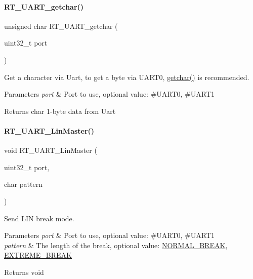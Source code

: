 \paragraph{\texorpdfstring{R\+T\+\_\+\+U\+A\+R\+T\+\_\+getchar()}{RT\_UART\_getchar()}}
{\footnotesize\ttfamily unsigned char R\+T\+\_\+\+U\+A\+R\+T\+\_\+getchar (\begin{DoxyParamCaption}\item[{uint32\+\_\+t}]{port }\end{DoxyParamCaption})}



Get a character via Uart, to get a byte via U\+A\+R\+T0, \mbox{\hyperlink{a00026_a0979671914792955a7a68461634ff82d}{getchar()}} is recommended. 


\begin{DoxyParams}{Parameters}
{\em port} & Port to use, optional value\+: \#\+U\+A\+R\+T0, \#\+U\+A\+R\+T1 \\
\hline
\end{DoxyParams}
\begin{DoxyReturn}{Returns}
char 1-\/byte data from Uart 
\end{DoxyReturn}
\mbox{\label{a00056_ab0faf051e642e540b1b9c114eae242bd}} 
\paragraph{\texorpdfstring{R\+T\+\_\+\+U\+A\+R\+T\+\_\+\+Lin\+Master()}{RT\_UART\_LinMaster()}}
{\footnotesize\ttfamily void R\+T\+\_\+\+U\+A\+R\+T\+\_\+\+Lin\+Master (\begin{DoxyParamCaption}\item[{uint32\+\_\+t}]{port,  }\item[{char}]{pattern }\end{DoxyParamCaption})}



Send L\+IN break mode. 


\begin{DoxyParams}{Parameters}
{\em port} & Port to use, optional value\+: \#\+U\+A\+R\+T0, \#\+U\+A\+R\+T1 \\
\hline
{\em pattern} & The length of the break, optional value\+: \mbox{\hyperlink{a00056_a7d77cd41951b1fe6b0874924df2bf689}{N\+O\+R\+M\+A\+L\+\_\+\+B\+R\+E\+AK}}, \mbox{\hyperlink{a00056_a7c76b3ed72795f2085873ee332fdab1b}{E\+X\+T\+R\+E\+M\+E\+\_\+\+B\+R\+E\+AK}} \\
\hline
\end{DoxyParams}
\begin{DoxyReturn}{Returns}
void 
\end{DoxyReturn}
\mbox{\label{a00056_ab03e9e1a8d4d9b97583db27174086108}} 
